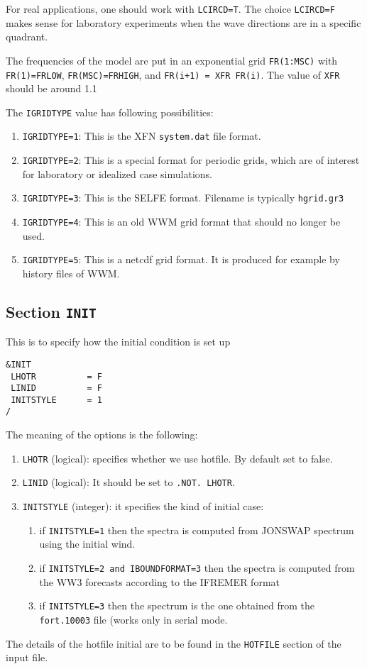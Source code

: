 \documentclass[12pt]{amsart}
\begin{document}
For real applications, one should work with {\tt LCIRCD=T}. The choice {\tt LCIRCD=F} makes sense for laboratory experiments when the wave directions are in a specific quadrant.

The frequencies of the model are put in an exponential grid {\tt FR(1:MSC)} with {\tt FR(1)=FRLOW}, {\tt FR(MSC)=FRHIGH}, and {\tt FR(i+1) = XFR FR(i)}. The value of {\tt XFR} should be around 1.1

The {\tt IGRIDTYPE} value has following possibilities:
\begin{enumerate}
\item {\tt IGRIDTYPE=1}: This is the XFN {\tt system.dat} file format.
\item {\tt IGRIDTYPE=2}: This is a special format for periodic grids, which are of interest for laboratory or idealized case simulations.
\item {\tt IGRIDTYPE=3}: This is the SELFE format. Filename is typically {\tt hgrid.gr3}
\item {\tt IGRIDTYPE=4}: This is an old WWM grid format that should no longer be used.
\item {\tt IGRIDTYPE=5}: This is a netcdf grid format. It is produced for example by history files of WWM.
\end{enumerate}




\subsection{Section {\tt INIT}}
This is to specify how the initial condition is set up
\begin{verbatim}
&INIT
 LHOTR          = F   
 LINID          = F   
 INITSTYLE      = 1   
/
\end{verbatim}
The meaning of the options is the following:
\begin{enumerate}
\item {\tt LHOTR} (logical): specifies whether we use hotfile. By default set to false.
\item {\tt LINID} (logical): It should be set to {\tt .NOT. LHOTR}.
\item {\tt INITSTYLE} (integer): it specifies the kind of initial case:
  \begin{enumerate}
  \item if {\tt INITSTYLE=1} then the spectra is computed from JONSWAP spectrum using the initial wind.
  \item if {\tt INITSTYLE=2 and IBOUNDFORMAT=3} then the spectra is computed from the WW3 forecasts according to the IFREMER format
  \item if {\tt INITSTYLE=3} then the spectrum is the one obtained from the {\tt fort.10003} file (works only in serial mode.
  \end{enumerate}
\end{enumerate}
The details of the hotfile initial are to be found in the {\tt HOTFILE} section of the input file.
\end{document}
